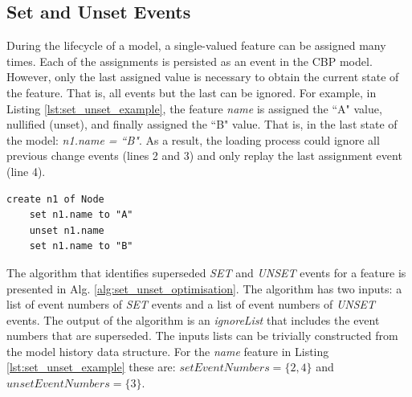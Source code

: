 \documentclass{llncs}
\begin{document}
    \vspace{-10pt}
    \subsection{Set and Unset Events}
    \label{subsec:set_and_unset_events}
    During the lifecycle of a model, a single-valued feature can be assigned many times.
    Each of the assignments is persisted as an event in the CBP model.
    However, only the last assigned value is necessary to obtain the current state of the feature. 
    That is, all events but the last can be ignored.
    For example, in Listing \ref{lst:set_unset_example}, the feature \emph{name} is assigned the ``A" value, nullified (unset), and finally assigned the ``B" value.
    That is, in the last state of the model: \emph{n1.name = ``B"}.
    As a result, the loading process could ignore all previous change events (lines 2 and 3) and only replay the last assignment event (line 4). 
    
    \begin{lstlisting}[style=eol,caption={The CBP representation of attribute \emph{name} assignments.},label=lst:set_unset_example]
    create n1 of Node
    set n1.name to "A"
    unset n1.name
    set n1.name to "B"
    \end{lstlisting}
    
    
    
    The algorithm that identifies superseded \emph{SET} and \emph{UNSET} events for a feature is presented in Alg. \ref{alg:set_unset_optimisation}.
    The algorithm has two inputs: a list of event numbers of \emph{SET} events and a list of event numbers of \emph{UNSET} events.
    The output of the algorithm is an \emph{ignoreList} that includes the event numbers that are superseded.
    The inputs lists can be trivially constructed from the model history data structure.
    For the \emph{name} feature in Listing \ref{lst:set_unset_example} these are: $setEventNumbers = \{2,4\}$ and $unsetEventNumbers = \{3\}$.
    
\end{document}

